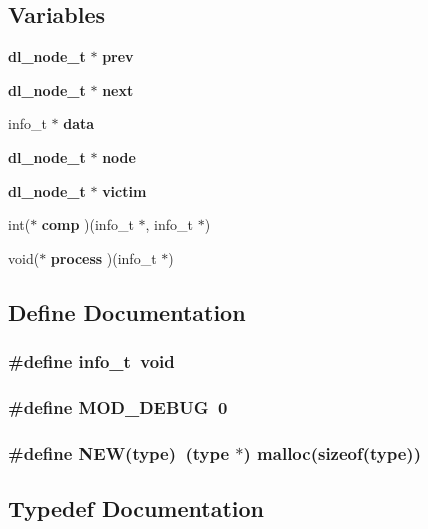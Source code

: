 \subsection*{Variables}
\begin{CompactItemize}
\item 
{\bf dl\_\-node\_\-t} $\ast$ {\bf prev}
\item 
{\bf dl\_\-node\_\-t} $\ast$ {\bf next}
\item 
info\_\-t $\ast$ {\bf data}
\item 
{\bf dl\_\-node\_\-t} $\ast$ {\bf node}
\item 
{\bf dl\_\-node\_\-t} $\ast$ {\bf victim}
\item 
int($\ast$ {\bf comp} )(info\_\-t $\ast$, info\_\-t $\ast$)
\item 
void($\ast$ {\bf process} )(info\_\-t $\ast$)
\end{CompactItemize}


\subsection{Define Documentation}
\subsubsection{\setlength{\rightskip}{0pt plus 5cm}\#define info\_\-t\ void}\label{P__dlist_8c_a2}


\subsubsection{\setlength{\rightskip}{0pt plus 5cm}\#define MOD\_\-DEBUG\ 0}\label{P__dlist_8c_a0}


\subsubsection{\setlength{\rightskip}{0pt plus 5cm}\#define NEW(type)\ (type $\ast$) malloc(sizeof(type))}\label{P__dlist_8c_a1}




\subsection{Typedef Documentation}
